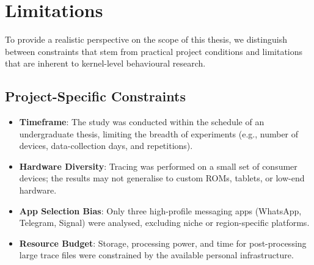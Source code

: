 \documentclass[a4paper,12pt]{report}
\begin{document}
\vspace{0.5em}
\noindent{}

\vspace{0.5em}
\noindent{}

\vspace{0.5em}
\noindent{}


\section{Limitations}

To provide a realistic perspective on the scope of this thesis, we distinguish between constraints that stem from practical project conditions and limitations that are inherent to kernel-level behavioural research.

\subsection*{Project-Specific Constraints}
\begin{itemize}
    \item \textbf{Timeframe}: The study was conducted within the schedule of an undergraduate thesis, limiting the breadth of experiments (e.g., number of devices, data-collection days, and repetitions).
    \item \textbf{Hardware Diversity}: Tracing was performed on a small set of consumer devices; the results may not generalise to custom ROMs, tablets, or low-end hardware.
    \item \textbf{App Selection Bias}: Only three high-profile messaging apps (WhatsApp, Telegram, Signal) were analysed, excluding niche or region-specific platforms.
    \item \textbf{Resource Budget}: Storage, processing power, and time for post-processing large trace files were constrained by the available personal infrastructure.
\end{itemize}
\end{document}
